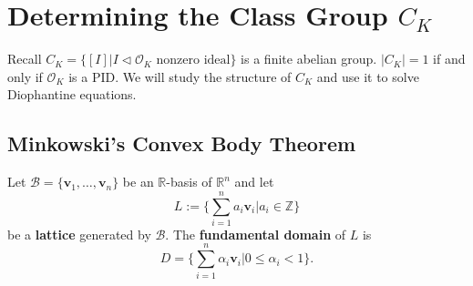 \documentclass[11pt]{book}
\begin{document}
\chapter{Determining the Class Group $C_{K}$}
Recall $C_{K}=\{[I]|I\lhd \mathcal{O}_{K} \text{ nonzero ideal}\}$ is a finite abelian group. $\left| C_{K} \right| =1$ if and only if $\mathcal{O}_{K}$ is a PID. We will study the structure of $C_{K}$ and use it to solve Diophantine equations. 

\section{Minkowski's Convex Body Theorem}
Let $\mathscr{B}=\{\mathbf{v}_{1},\dots,\mathbf{v}_{n}\}$ be an $\mathbb{R}$-basis of $\mathbb{R}^{n}$ and let 
\[
L:=\{\sum_{i=1}^{n}a_{i}\mathbf{v}_{i}|a_{i}\in \mathbb{Z}\}
\]
be a {\bf lattice} generated by $\mathscr{B}$. 
The {\bf fundamental domain} of $L$ is 
\[
D=\{\sum_{i=1}^{n}\alpha_{i}\mathbf{v}_{i}|0\leq \alpha_{i}<1\}. 
\]
\end{document}
